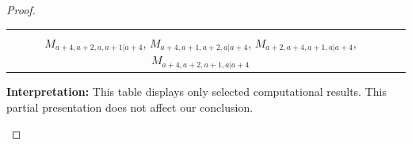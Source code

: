 \begin{proof}
\begin{enumerate}
\begin{enumerate}
\begin{enumerate}
\begin{table}[htbp]
\begin{tabular}{cc}
{ $M_{a+4,a,a+2,a+1|a+4}$,
 $M_{a+2,a+4,a,a+1|a+4}$,
 $M_{a+1,a+4,a+2,a|a+4}$, \\
 $M_{a+4,a+2,a,a+1|a+4}$,
 $M_{a+4,a+1,a+2,a|a+4}$,
 $M_{a+2,a+4,a+1,a|a+4}$,
 $M_{a+4,a+2,a+1,a|a+4}$
}\\
\bottomrule
\end{tabular}
\vspace{0.5em}
\parbox{\linewidth}{\small
\textbf{Interpretation:}
This table displays only selected computational results. This partial presentation does not affect our conclusion.
}
\end{table}
      \end{enumerate}
  \end{enumerate}
\end{enumerate}

\end{proof}
